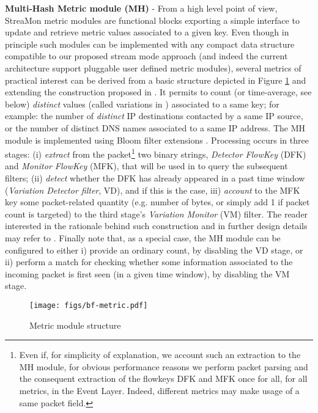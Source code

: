 \documentclass[conference,letterpaper]{sig-alternate-10pt}
\begin{document}
\textbf{Multi-Hash Metric module (MH)} - From a high level point of view, StreaMon metric modules are functional blocks exporting a simple interface to update and retrieve metric values associated to a given key. Even though in principle such modules can be implemented with any compact data structure compatible to our proposed stream mode approach (and indeed the current architecture support pluggable user defined metric modules),  several metrics of practical interest can be derived from a basic structure depicted in Figure \ref{fig:bf-metric} and extending the construction proposed in \cite{info10Bianchi}. It permits to count (or time-average, see below) {\em distinct} values (called variations in \cite{info10Bianchi}) associated to a same key; for example: the number of {\em distinct} IP destinations contacted by a same IP source, or the number of distinct DNS names associated to a same IP address. The MH module is implemented using Bloom filter extensions \cite{broder02, info10Bianchi, ccr11Bianchi}. Processing occurs in three stages: (i) \emph{extract} from the packet\footnote{
	Even if, for simplicity of explanation, we account such an extraction 
	to the MH module, for obvious performance reasons we perform packet 
	parsing and the consequent extraction of the flowkeys DFK and MFK once 
	for all, for all metrics, in the Event Layer. Indeed, different metrics may make
	usage of a same packet field.}
two binary strings, \emph{Detector FlowKey} (DFK) and  \emph{Monitor FlowKey} (MFK), that will be used in to query the subsequent filters; (ii) \emph{detect} whether the DFK has already appeared in a past time window (\emph{Variation Detector filter}, VD), and if this is the case, iii) \emph{account} to the MFK key some packet-related quantity (e.g. number of bytes, or simply add 1 if packet count is targeted) to the third stage's  \emph{Variation Monitor} (VM) filter. The reader interested in the rationale behind such construction and in further design details may refer to \cite{info10Bianchi}. Finally note that, as a special case, the MH module can be configured to either i) provide an ordinary count, by disabling the VD stage, or ii) perform a match for checking whether some information associated to the incoming packet is first seen (in a given time window), by disabling the VM stage.

\begin{figure}[!t]
\centering
\texttt{[image: figs/bf-metric.pdf]}
\vspace*{-.5cm}
\caption{Metric module structure}
\vspace*{-.5cm}
\label{fig:bf-metric}
\end{figure}
\end{document}
